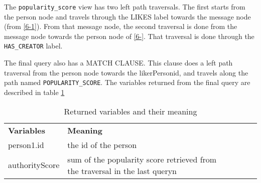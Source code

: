The \texttt{popularity\_score} view has two left path traversals. The first starts from the person node and travels through
the LIKES label towards the message node (from \ref{6-1}). From that message node, the second traversal is done from the
message node towards the person node of \ref{6-}. That traversal is done through the  \texttt{HAS\_CREATOR} label.

The final query also has a MATCH CLAUSE. This clause does a left path traversal from the person node towards the 
likerPersonid, and travels along the path named \texttt{POPULARITY\_SCORE}. The variables returned from the final query are described 
in table \ref{RetCypher6BITable}
\begin{table}[!ht]
\begin{tabular}{|l|l|lll}
\cline{1-2}
\textbf{Variables}      & \textbf{Meaning}                                                                             &  &  &  \\ \cline{1-2}
person1.id     & the id of the person                                                                &  &  &  \\ \cline{1-2}
authorityScore & sum of the popularity score retrieved from the traversal in the last queryn  &  &  &  \\ \cline{1-2}
                                                                   
\end{tabular}
\caption{Returned variables and their meaning}
\label{RetCypher6BITable}
\end{table}